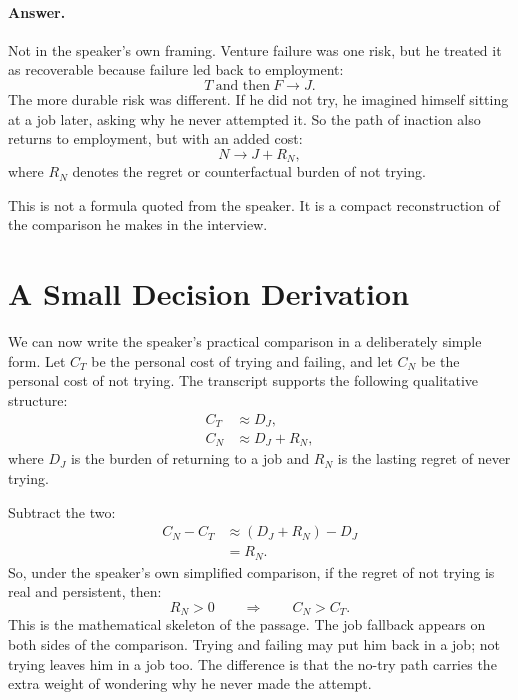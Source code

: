 \paragraph{Answer.}
Not in the speaker's own framing. Venture failure was one risk, but he treated it as recoverable because failure led back to employment:
\begin{equation}
T \ \text{and then} \ F \longrightarrow J.
\end{equation}
The more durable risk was different. If he did not try, he imagined himself sitting at a job later, asking why he never attempted it. So the path of inaction also returns to employment, but with an added cost:
\begin{equation}
N \longrightarrow J + R_N,
\end{equation}
where \(R_N\) denotes the regret or counterfactual burden of not trying.

This is not a formula quoted from the speaker. It is a compact reconstruction of the comparison he makes in the interview.

\section{A Small Decision Derivation}

We can now write the speaker's practical comparison in a deliberately simple form. Let \(C_T\) be the personal cost of trying and failing, and let \(C_N\) be the personal cost of not trying. The transcript supports the following qualitative structure:
\begin{align}
C_T &\approx D_J, \\
C_N &\approx D_J + R_N,
\end{align}
where \(D_J\) is the burden of returning to a job and \(R_N\) is the lasting regret of never trying.

Subtract the two:
\begin{align}
C_N - C_T
&\approx (D_J + R_N) - D_J \\
&= R_N.
\end{align}
So, under the speaker's own simplified comparison, if the regret of not trying is real and persistent, then:
\begin{equation}
R_N > 0
\qquad \Longrightarrow \qquad
C_N > C_T.
\end{equation}
This is the mathematical skeleton of the passage. The job fallback appears on both sides of the comparison. Trying and failing may put him back in a job; not trying leaves him in a job too. The difference is that the no-try path carries the extra weight of wondering why he never made the attempt.

